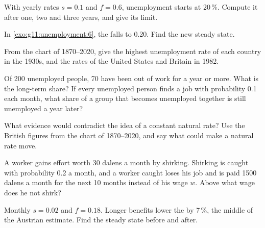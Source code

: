 \begin{exercise}[$\star\star$]\label{exo:g11:unemployment:8}
With yearly rates $s = 0.1$ and $f = 0.6$, unemployment starts at 20\,\%. Compute it after one, two and three years, and give its limit.
\end{exercise}

\begin{exercise}[$\star\star$]\label{exo:g11:unemployment:9}
In \cref{exo:g11:unemployment:6}, the  falls to 0.20. Find the new steady state.
\end{exercise}

\begin{exercise}[$\star\star$]\label{exo:g11:unemployment:10}
From the chart of 1870--2020, give the highest unemployment rate of each country in the 1930s, and the rates of the United States and Britain in 1982.
\end{exercise}

\begin{exercise}[$\star\star$]\label{exo:g11:unemployment:11}
Of 200 unemployed people, 70 have been out of work for a year or more. What is the long-term share? If every unemployed person finds a job with probability 0.1 each month,
what share of a group that becomes unemployed together is still unemployed a year later?
\end{exercise}

\begin{exercise}[$\star\star\star$]\label{exo:g11:unemployment:12}
What evidence would contradict the idea of a constant natural rate? Use the British figures from the chart of 1870--2020, and say what could make a natural rate move.
\end{exercise}

\begin{exercise}[$\star\star\star$]\label{exo:g11:unemployment:13}
A worker gains effort worth 30 dalens a month by shirking. Shirking is caught with probability 0.2 a month, and a worker caught loses his job and is paid 1500 dalens a month
for the next 10 months instead of his wage $w$. Above what wage does he not shirk?
\end{exercise}

\begin{exercise}[$\star\star\star$]\label{exo:g11:unemployment:14}
Monthly $s = 0.02$ and $f = 0.18$. Longer benefits lower the  by 7\,\%, the middle of the Austrian estimate. Find the steady state before and after.
\end{exercise}

